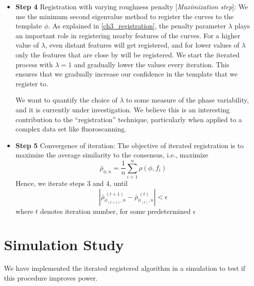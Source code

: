 \begin{itemize}
\item {\bf{Step 4}} Registration with varying roughness penalty [{\emph{Maximization step}}]: We use the minimum second eigenvalue method to register the curves to the template $\phi$. As explained in \ref{ch3_registration}, the penalty parameter $\lambda$ plays an important role in registering nearby features of the curves. For a higher value of $\lambda$, even distant features will get registered, and for lower values of $\lambda$ only the features that are close by will be registered. We start the iterated process with $\lambda = 1$ and gradually lower the values every iteration. This ensures that we gradually increase our confidence in the template that we register to. 
\begin{tcolorbox}[colback=green!5,colframe=green!40!black,title=Work in progress] %
We want to quantify the choice of $\lambda$ to some measure of the phase variability, and it is currently under investigation. We believe this is an interesting contribution to the ``registration'' technique, particularly when applied to a complex data set like fluoroscanning.
\end{tcolorbox}
\item {\bf{Step 5}} Convergence of iteration: The objective of iterated registration is to maximize the average similarity to the consensus, i.e., maximize 
\[ \bar{\rho}_{\phi, n} = \frac{1}{n} \sum \limits_{i = 1}^{n} \rho(\phi, f_i)\]
Hence, we iterate steps 3 and 4, until
\[ |\bar{\rho}_{\phi_{(t+1)}, n}^{\ (t+1)} - \bar{\rho}_{\phi_{(t)}, n}^{ \ (t)} | < \epsilon \]
where $t$ denotes iteration number, for some predetermined $\epsilon$
\end{itemize}

\section{Simulation Study}
We have implemented the iterated registered algorithm in a simulation to test if this procedure improves power. 
